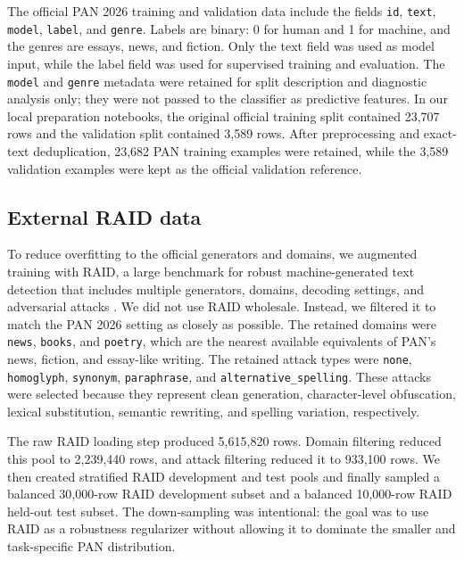 \documentclass[]{ceurart}
\begin{document}
The official PAN 2026 training and validation data include the fields \texttt{id}, \texttt{text}, \texttt{model}, \texttt{label}, and \texttt{genre}. Labels are binary: 0 for human and 1 for machine, and the genres are essays, news, and fiction. Only the text field was used as model input, while the label field was used for supervised training and evaluation. The \texttt{model} and \texttt{genre} metadata were retained for split description and diagnostic analysis only; they were not passed to the classifier as predictive features. In our local preparation notebooks, the original official training split contained 23,707 rows and the validation split contained 3,589 rows. After preprocessing and exact-text deduplication, 23,682 PAN training examples were retained, while the 3,589 validation examples were kept as the official validation reference.

\subsection{External RAID data}

To reduce overfitting to the official generators and domains, we augmented training with RAID, a large benchmark for robust machine-generated text detection that includes multiple generators, domains, decoding settings, and adversarial attacks \cite{dugan2024raid}. We did not use RAID wholesale. Instead, we filtered it to match the PAN 2026 setting as closely as possible. The retained domains were \texttt{news}, \texttt{books}, and \texttt{poetry}, which are the nearest available equivalents of PAN's news, fiction, and essay-like writing. The retained attack types were \texttt{none}, \texttt{homoglyph}, \texttt{synonym}, \texttt{paraphrase}, and \texttt{alternative\_spelling}. These attacks were selected because they represent clean generation, character-level obfuscation, lexical substitution, semantic rewriting, and spelling variation, respectively.

The raw RAID loading step produced 5,615,820 rows. Domain filtering reduced this pool to 2,239,440 rows, and attack filtering reduced it to 933,100 rows. We then created stratified RAID development and test pools and finally sampled a balanced 30,000-row RAID development subset and a balanced 10,000-row RAID held-out test subset. The down-sampling was intentional: the goal was to use RAID as a robustness regularizer without allowing it to dominate the smaller and task-specific PAN distribution.
\end{document}
